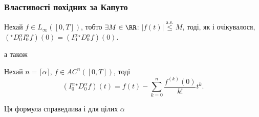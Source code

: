 \subsubsection{Властивості похідних за Капуто}
\begin{theorem}
    Нехай $f \in L_\infty([0,T])$, тобто $\exists M \in \RR$: $|f(t)| \overset{\text{a.e.}}{\le} M$, тоді, як і очікувалося, $({}^\star D_0^\alpha I_0^\alpha f)(0) = (I_0^\alpha {}^\star D_0^\alpha f)(0)$.
\end{theorem}
а також
\begin{theorem}
    Нехай $n = \lceil \alpha \rceil$, $f \in AC^n([0,T])$, тоді
    \begin{equation}
        (I_0^\alpha {}^\star D_0^\alpha f)(t) = f(t) - \sum_{k = 0}^n \frac{f^{(k)}(0)}{k!} t^k.
    \end{equation}
\end{theorem}
\begin{remark}
    Ця формула справедлива і для цілих $\alpha$
\end{remark}

